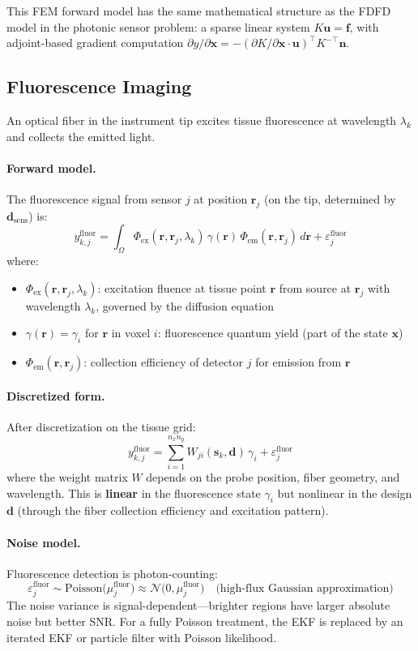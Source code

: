 \documentclass[11pt,a4paper]{article}
\theoremstyle{definition}
\begin{document}
This FEM forward model has the same mathematical structure as the FDFD model in the photonic sensor problem: a sparse linear system $K \bm{u} = \bm{f}$, with adjoint-based gradient computation $\partial y / \partial \bm{x} = -(\partial K / \partial \bm{x} \cdot \bm{u})^\top K^{-\top} \bm{n}$.

\subsection{Fluorescence Imaging}

An optical fiber in the instrument tip excites tissue fluorescence at wavelength $\lambda_k$ and collects the emitted light.

\paragraph{Forward model.}
The fluorescence signal from sensor $j$ at position $\bm{r}_j$ (on the tip, determined by $\bm{d}_{\text{sens}}$) is:
\[
  y^{\text{fluor}}_{k,j} = \int_{\Omega} \Phi_{\text{ex}}(\bm{r}, \bm{r}_j, \lambda_k) \, \gamma(\bm{r}) \, \Phi_{\text{em}}(\bm{r}, \bm{r}_j) \, d\bm{r} + \varepsilon^{\text{fluor}}_j
\]
where:
\begin{itemize}[nosep]
  \item $\Phi_{\text{ex}}(\bm{r}, \bm{r}_j, \lambda_k)$: excitation fluence at tissue point $\bm{r}$ from source at $\bm{r}_j$ with wavelength $\lambda_k$, governed by the diffusion equation
  \item $\gamma(\bm{r}) = \gamma_i$ for $\bm{r}$ in voxel $i$: fluorescence quantum yield (part of the state $\bm{x}$)
  \item $\Phi_{\text{em}}(\bm{r}, \bm{r}_j)$: collection efficiency of detector $j$ for emission from $\bm{r}$
\end{itemize}

\paragraph{Discretized form.}
After discretization on the tissue grid:
\[
  y^{\text{fluor}}_{k,j} = \sum_{i=1}^{n_x n_y} W_{ji}(\bm{s}_k, \bm{d}) \, \gamma_i + \varepsilon^{\text{fluor}}_j
\]
where the weight matrix $W$ depends on the probe position, fiber geometry, and wavelength.  This is \textbf{linear} in the fluorescence state $\gamma_i$ but nonlinear in the design $\bm{d}$ (through the fiber collection efficiency and excitation pattern).

\paragraph{Noise model.}
Fluorescence detection is photon-counting:
\[
  \varepsilon^{\text{fluor}}_j \sim \text{Poisson}\big(\mu^{\text{fluor}}_j\big) \approx \mathcal{N}\big(0, \mu^{\text{fluor}}_j\big) \quad \text{(high-flux Gaussian approximation)}
\]
The noise variance is signal-dependent---brighter regions have larger absolute noise but better SNR.  For a fully Poisson treatment, the EKF is replaced by an iterated EKF or particle filter with Poisson likelihood.
\end{document}

